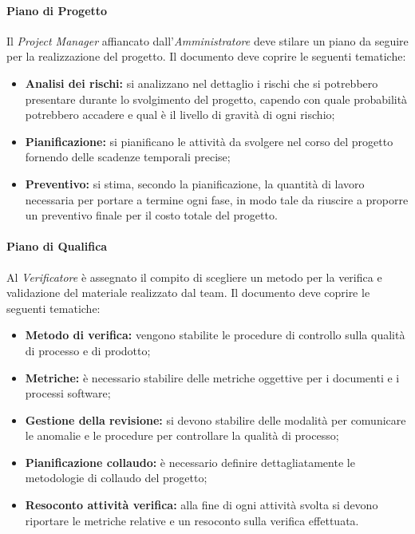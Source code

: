 		\paragraph{Piano di Progetto} \Spazio
		Il \emph{Project Manager} affiancato dall'\emph{Amministratore} deve stilare un piano da seguire per la realizzazione del progetto.
		Il documento deve coprire le seguenti tematiche:
		\begin{itemize}
		\item \textbf{Analisi dei rischi:} si analizzano nel dettaglio i rischi che si potrebbero presentare durante lo svolgimento del progetto, capendo con quale probabilità potrebbero accadere e qual è il livello di gravità di ogni rischio;
		\item \textbf{Pianificazione:} si pianificano le attività da svolgere nel corso del progetto fornendo delle scadenze temporali precise;
		\item \textbf{Preventivo:} si stima, secondo la pianificazione, la quantità di lavoro necessaria per portare a termine ogni fase, in modo tale da riuscire a proporre un preventivo finale per il costo totale del progetto.
		\end{itemize} 
		
		\paragraph{Piano di Qualifica} \Spazio
		Al \emph{Verificatore} è assegnato il compito di scegliere un metodo per la verifica e validazione del materiale realizzato dal team.
		Il documento deve coprire le seguenti tematiche:
		\begin{itemize}
		\item \textbf{Metodo di verifica:} vengono stabilite le procedure di controllo sulla qualità di processo e di prodotto;
		\item \textbf{Metriche:} è necessario stabilire delle metriche oggettive per i documenti e i processi software;
		\item \textbf{Gestione della revisione:} si devono stabilire delle modalità per comunicare le anomalie e le procedure per controllare la qualità di processo;
		\item \textbf{Pianificazione collaudo:} è necessario definire dettagliatamente le metodologie di collaudo del progetto;
		\item \textbf{Resoconto attività verifica:} alla fine di ogni attività svolta si devono riportare le metriche relative e un resoconto sulla verifica effettuata.
		\end{itemize}
	
